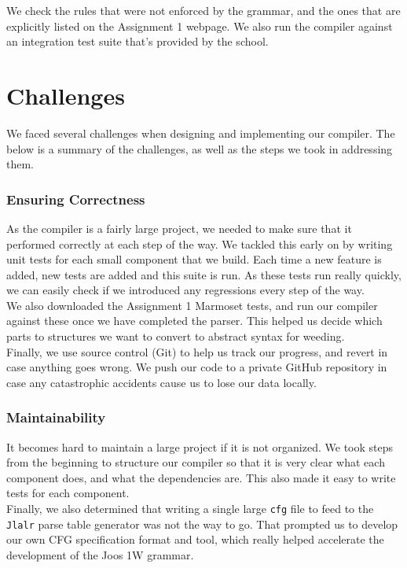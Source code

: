\documentclass[12pt, a4paper]{article}
\begin{document}
We check the rules that were not enforced by the grammar, and the ones that are explicitly listed on the Assignment 1 webpage. We also run the compiler against an integration test suite that's provided by the school.


\section{Challenges}

We faced several challenges when designing and implementing our compiler. The below is a summary of the challenges, as well as the steps we took in addressing them.

\subsubsection{Ensuring Correctness}

As the compiler is a fairly large project, we needed to make sure that it performed correctly at each step of the way. We tackled this early on by writing unit tests for each small component that we build. Each time a new feature is added, new tests are added and this suite is run. As these tests run really quickly, we can easily check if we introduced any regressions every step of the way. \\

We also downloaded the Assignment 1 Marmoset tests, and run our compiler against these once we have completed the parser. This helped us decide which parts to structures we want to convert to abstract syntax for weeding. \\

Finally, we use source control (Git) to help us track our progress, and revert in case anything goes wrong. We push our code to a private GitHub repository in case any catastrophic accidents cause us to lose our data locally.

\subsubsection{Maintainability}

It becomes hard to maintain a large project if it is not organized. We took steps from the beginning to structure our compiler so that it is very clear what each component does, and what the dependencies are. This also made it easy to write tests for each component. \\

Finally, we also determined that writing a single large \verb|cfg| file to feed to the \verb|Jlalr| parse table generator was not the way to go. That prompted us to develop our own CFG specification format and tool, which really helped accelerate the development of the Joos 1W grammar.
\end{document}
